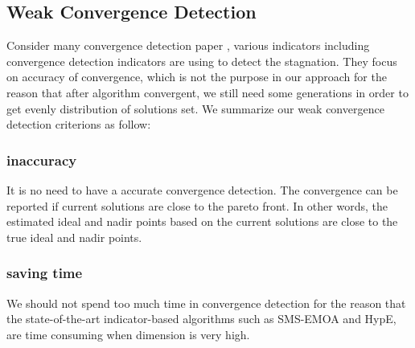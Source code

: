 \documentclass[conference]{IEEEtran}
\begin{document}
%
%
%
\subsection{Weak Convergence Detection}
Consider many convergence detection paper \cite{convergence detection},
various indicators including convergence detection indicators are using to detect the stagnation.
They focus on accuracy of convergence, which is not the purpose in our approach for 
the reason that after algorithm convergent, we still need some generations in order to
get evenly distribution of solutions set. 
We summarize our weak convergence detection criterions as follow:
\subsubsection{inaccuracy} It is no need to have a accurate convergence detection. 
The convergence can be reported if current solutions are close to the pareto front.
In other words, the estimated ideal and nadir points based on the current solutions
are close to the true ideal and nadir points. 
\subsubsection{saving time} We should not spend too much time in convergence detection
for the reason that the state-of-the-art indicator-based algorithms such as SMS-EMOA and HypE, 
are time consuming when dimension is very high. 
\end{document}
